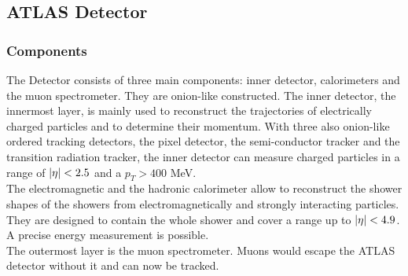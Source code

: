 \documentclass[12pt, a4paper, bibliography=totoc]{scrartcl}
\begin{document}
\begin{multicols}{2}
\subsection{ATLAS Detector}
\subsubsection{Components}
The Detector consists of three main components: inner detector, calorimeters and the muon spectrometer.
They are onion-like constructed. 
The inner detector, the innermost layer, is mainly used to reconstruct the trajectories of electrically charged particles and to determine their momentum. 
With three also onion-like ordered tracking detectors, the pixel detector, the semi-conductor tracker and the transition radiation tracker, the inner detector can measure charged particles in a range of $\abs{\eta} < 2.5$ and a $p_{T} > 400$ \si{MeV}.\\

The electromagnetic and the hadronic calorimeter allow to reconstruct the shower shapes of the showers from electromagnetically and strongly interacting particles. 
They are designed to contain the whole shower and cover a range up to $\abs{\eta} < 4.9$. 
A precise energy measurement is possible.\\
The outermost layer is the muon spectrometer.
Muons would escape the ATLAS detector without it and can now be tracked. 


\end{multicols}
\end{document}
